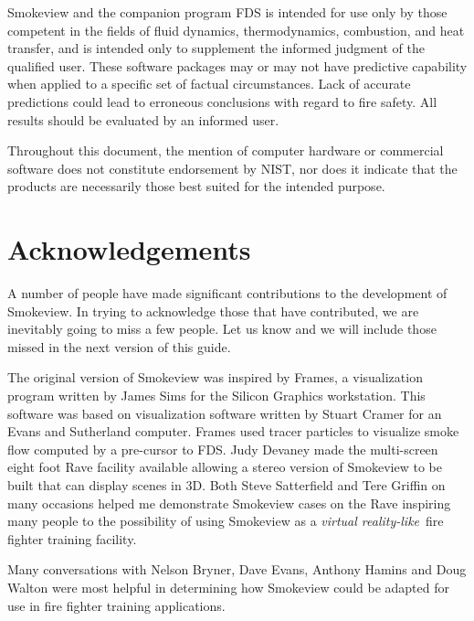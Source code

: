 \documentclass[11pt,twoside]{book}
\begin{document}
Smokeview and the companion program FDS is intended for use only
by those competent in the fields of fluid dynamics,
thermodynamics, combustion, and heat transfer, and is intended
only to supplement the informed judgment of the qualified user.
These software packages may or may not have predictive capability
when applied to a specific set of factual circumstances. Lack of
accurate predictions could lead to erroneous conclusions with
regard to fire safety. All results should be evaluated by an
informed user.

Throughout this document, the mention of computer hardware or
commercial software does not constitute endorsement by NIST,
nor does
it indicate that the products are necessarily those
best suited for the
intended purpose.


\chapter*{Acknowledgements}
A number of people have made significant contributions to the
development of Smokeview. In trying to acknowledge those that have
contributed, we are inevitably going to miss a few people.  Let us
know and we will include those missed in the next version of this
guide.

The original version of Smokeview was inspired by Frames, a
visualization program written by James Sims for the Silicon
Graphics workstation.  This software was based on visualization
software written by Stuart Cramer for an Evans and Sutherland
computer. Frames used tracer particles to visualize smoke flow
computed by a pre-cursor to FDS. Judy Devaney made the
multi-screen eight foot Rave facility available allowing a stereo
version of Smokeview to be built that can display scenes in
3D.  Both Steve Satterfield and Tere Griffin on many occasions
helped me demonstrate Smokeview cases on the Rave inspiring many
people to the possibility of using Smokeview as a {\em virtual
reality-like}\ fire fighter training facility.

Many conversations with Nelson Bryner, Dave Evans, Anthony Hamins
and Doug Walton were most helpful in determining how Smokeview
could be adapted for use in fire fighter training applications.
\end{document}
